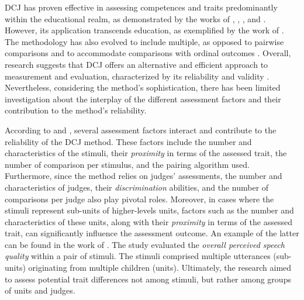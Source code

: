 \documentclass[
  12pt]{article}
\begin{document}
DCJ has proven effective in assessing competences and traits
predominantly within the educational realm, as demonstrated by the works
of \citet{Pollitt_2012b}, \citet{Bartholomew_et_al_2018},
\citet{vanDaal_et_al_2016} \citet{Lesterhuis_2018}, and
\citet{Bartholomew_et_al_2020}. However, its application transcends
education, as exemplified by the work of \citet{Boonen_et_al_2020}. The
methodology has also evolved to include multiple, as opposed to pairwise
comparisons \citep{Luce_1959, Placket_1975} and to accommodate
comparisons with ordinal outcomes \citep{Tutz_1986, Agresti_1992}.
Overall, research suggests that DCJ offers an alternative and efficient
approach to measurement and evaluation, characterized by its reliability
and validity \citep{Lesterhuis_2018, vanDaal_2020, Marshall_et_al_2020}.
Nevertheless, considering the method's sophistication, there has been
limited investigation about the interplay of the different assessment
factors and their contribution to the method's reliability.

According to \citet{Verhavert_et_al_2019} and \citet{vanDaal_2020},
several assessment factors interact and contribute to the reliability of
the DCJ method. These factors include the number and characteristics of
the stimuli, their \emph{proximity} in terms of the assessed trait, the
number of comparison per stimulus, and the pairing algorithm used.
Furthermore, since the method relies on judges' assessments, the number
and characteristics of judges, their \emph{discrimination} abilities,
and the number of comparisons per judge also play pivotal roles.
Moreover, in cases where the stimuli represent sub-units of
higher-levels units, factors such as the number and characteristics of
these units, along with their \emph{proximity} in terms of the assessed
trait, can significantly influence the assessment outcome. An example of
the latter can be found in the work of \citet{Boonen_et_al_2020}. The
study evaluated the \emph{overall perceived speech quality} within a
pair of stimuli. The stimuli comprised multiple utterances (sub-units)
originating from multiple children (units). Ultimately, the research
aimed to assess potential trait differences not among stimuli, but
rather among groups of units and judges.
\end{document}
